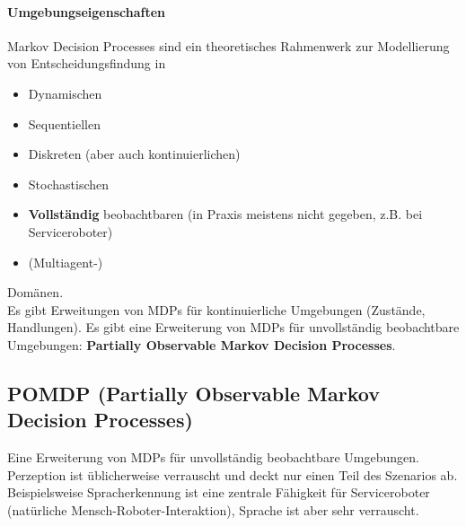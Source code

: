 \paragraph{Umgebungseigenschaften}
Markov Decision Processes sind ein theoretisches Rahmenwerk zur Modellierung von Entscheidungsfindung in
\begin{itemize}
	\item Dynamischen
	\item Sequentiellen
	\item Diskreten (aber auch kontinuierlichen)
	\item Stochastischen
	\item \textbf{Vollst\"andig} beobachtbaren (in Praxis meistens nicht gegeben, z.B. bei Serviceroboter)
	\item (Multiagent-)
\end{itemize}
Domänen.\\
Es gibt Erweitungen von MDPs für kontinuierliche Umgebungen (Zustände, Handlungen). Es gibt eine Erweiterung von MDPs für unvollständig beobachtbare Umgebungen: \textbf{Partially Observable Markov
Decision Processes}.

\subsection{POMDP (Partially Observable Markov Decision Processes)}
Eine Erweiterung von MDPs f\"ur unvollst\"andig beobachtbare Umgebungen. Perzeption ist \"ublicherweise verrauscht und deckt nur einen Teil des Szenarios ab. Beispielsweise Spracherkennung ist eine zentrale Fähigkeit für Serviceroboter (natürliche Mensch-Roboter-Interaktion), Sprache ist aber sehr verrauscht.

